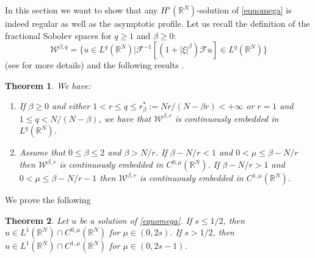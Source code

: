 \documentclass[10pt]{amsart}
\numberwithin{equation}{section}
\newtheorem{theorem}{Theorem}[section]
\begin{document}
\noindent
In this section we want to show that any ${H^{s}(\mathbb R^{N})}$-solution of \eqref{equomega} is indeed regular
as well as the asymptotic profile.
Let us recall the definition of the fractional Sobolev spaces for $q\geq 1$ and $\beta\geq0$:
\begin{equation}
\label{defW}
\mathcal{W}^{\beta,q}=\{u\in L^q(\mathbb{R}^N) \vert \mathcal{F}^{-1}[(1+|\xi|^\beta)\mathcal{F}u ]\in L^q(\mathbb{R}^N) \}
\end{equation}
(see \cite{Stein} for more details) and the following results \cite[Theorem 3.2]{FQT}.
\begin{theorem}
\label{richiamisob}
We have:
\begin{enumerate}[label=(\roman*),ref=\roman*]
\item \label{contemb} If $\beta\geq 0$ and either $1<r\leq q \leq r^*_\beta:=Nr/(N-\beta r)<+\infty$ or $r=1$ and $1 \leq q < N/(N-\beta)$, we have that $\mathcal{W}^{\beta,r}$ is continuously embedded in $L^q(\mathbb{R}^N)$.
\item \label{Memb} Assume that $0\leq\beta\leq 2$ and $\beta > N/r$. If $\beta-N/r <1$ and $0<\mu\leq\beta - N/r$ then $\mathcal{W}^{\beta,r}$ is continuously embedded in $C^{0,\mu}(\mathbb{R}^N)$. If $\beta-N/r >1$ and $0<\mu\leq\beta - N/r - 1$ then $\mathcal{W}^{\beta,r}$ is continuously embedded in $C^{1,\mu}(\mathbb{R}^N)$. 
\end{enumerate}
\end{theorem}

\noindent
We prove the following
\begin{theorem}
\label{thregularity}
Let $u$ be a solution of \eqref{equomega}. 
If $s\leq 1/2$, then $u\in L^1 (\mathbb{R}^N) \cap C^{0,\mu}(\mathbb{R}^N)$ for $\mu\in(0,2s)$. If $s>1/2$, then $u\in  L^1 (\mathbb{R}^N) \cap C^{1,\mu}(\mathbb{R}^N)$ for $\mu\in(0,2s- 1)$.
\end{theorem}
\end{document}
